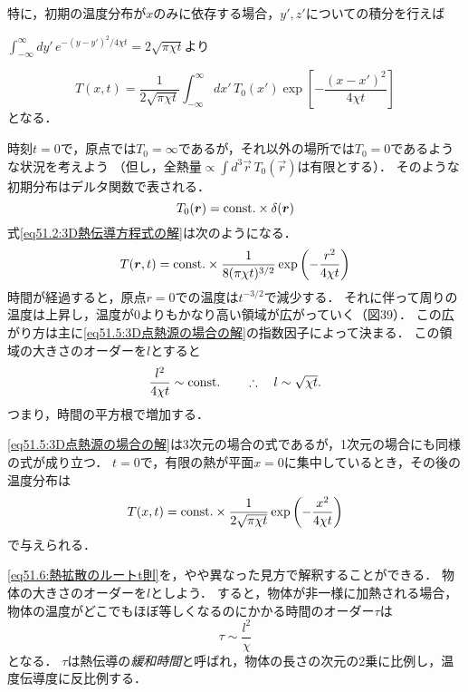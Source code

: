 特に，初期の温度分布が$x$のみに依存する場合，$y',z'$についての積分を行えば
\begin{details}
$\displaystyle \int_{-\infty}^{\infty} dy' \, e^{-(y-y')^2/4\chi t} = 2\sqrt{\pi\chi t}$より
\end{details}
\begin{equation}
    T(x, t) = \frac{1}{2\sqrt{\pi\chi t}} \int_{-\infty}^{\infty} dx' \, T_0(x') \exp\left[ - \frac{(x-x')^2}{4\chi t} \right]
\end{equation}
となる．



時刻$t=0$で，原点では$T_0=\infty$であるが，それ以外の場所では$T_0=0$であるような状況を考えよう
（但し，全熱量$\propto \displaystyle\int d^3\vec{r} \, T_0(\vec{r})$は有限とする）．
そのような初期分布はデルタ関数で表される．
\begin{equation}
    T_0(\vb*{r}) = \mathrm{const.} \times \delta(\vb*{r})
\end{equation}
式\eqref{eq51.2:3D熱伝導方程式の解}は次のようになる．
\begin{equation}\label{eq51.5:3D点熱源の場合の解}
    T(\vb*{r}, t) = \mathrm{const.} \times \frac{1}{8(\pi\chi t)^{3/2}} \exp\left( - \frac{r^2}{4\chi t} \right) 
\end{equation}
時間が経過すると，原点$r=0$での温度は$t^{-3/2}$で減少する．
それに伴って周りの温度は上昇し，温度が0よりもかなり高い領域が広がっていく（図39）．
この広がり方は主に\eqref{eq51.5:3D点熱源の場合の解}の指数因子によって決まる．
この領域の大きさのオーダーを$l$とすると
\begin{equation}\label{eq51.6:熱拡散のルートt則}
    \frac{l^2}{4\chi t} \sim \mathrm{const.}
    \qquad\therefore\quad l \sim \sqrt{\chi t}.
\end{equation}
つまり，時間の平方根で増加する．


\eqref{eq51.5:3D点熱源の場合の解}は3次元の場合の式であるが，1次元の場合にも同様の式が成り立つ．
$t=0$で，有限の熱が平面$x=0$に集中しているとき，その後の温度分布は
\begin{equation}\label{eq51.7:1D面熱源の場合の解}
    T(x, t) = \mathrm{const.} \times \frac{1}{2\sqrt{\pi\chi t}} \exp\left( - \frac{x^2}{4\chi t} \right) 
\end{equation}
で与えられる．




\eqref{eq51.6:熱拡散のルートt則}を，やや異なった見方で解釈することができる．
物体の大きさのオーダーを$l$としよう．
すると，物体が非一様に加熱される場合，物体の温度がどこでもほぼ等しくなるのにかかる時間のオーダー$\tau$は
\begin{equation}
    \tau \sim \frac{l^2}{\chi}
\end{equation}
となる．
$\tau$は熱伝導の\emph{緩和時間}と呼ばれ，物体の長さの次元の2乗に比例し，温度伝導度に反比例する．




